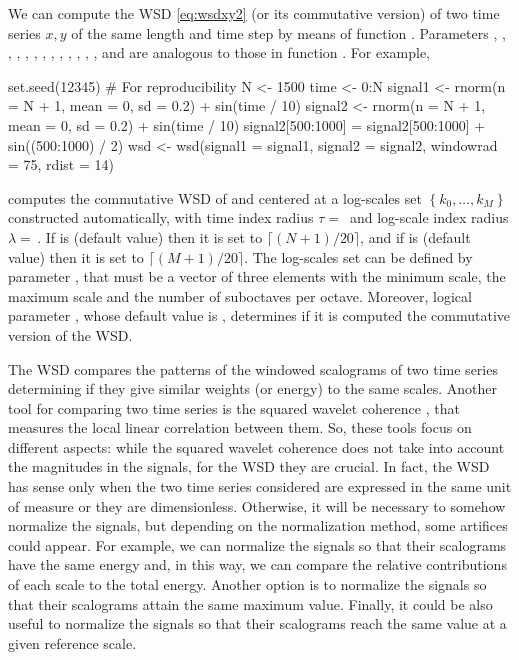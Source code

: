 We can compute the WSD \eqref{eq:wsdxy2} (or its commutative version) of two time series $x,y$ of the same length and time step by means of function . Parameters , , , , , , , , , , , , ,  and  are analogous to those in function . For example,
\begin{example}
set.seed(12345) # For reproducibility
N <- 1500
time <- 0:N
signal1 <- rnorm(n = N + 1, mean = 0, sd = 0.2) + sin(time / 10)
signal2 <- rnorm(n = N + 1, mean = 0, sd = 0.2) + sin(time / 10)
signal2[500:1000] = signal2[500:1000] + sin((500:1000) / 2)
wsd <- wsd(signal1 = signal1, signal2 = signal2,
           windowrad = 75, rdist = 14)
\end{example}
computes the commutative WSD of  and  centered at a log-scales set $\left\{ k_0,\ldots ,k_M\right\} $ constructed automatically, with time index radius $\tau =\,$ and log-scale index radius $\lambda =\,$. If  is  (default value) then it is set to $\lceil (N+1)/20\rceil $, and if  is  (default value) then it is set to $\lceil (M+1)/20\rceil $. The log-scales set can be defined by parameter , that must be a vector of three elements with the minimum scale, the maximum scale and the number of suboctaves per octave. Moreover, logical parameter , whose default value is , determines if it is computed the commutative version of the WSD.

\begin{rmk}[Normalization]
\label{rem:norm}
The WSD compares the patterns of the windowed scalograms of two time series determining if they give similar weights (or energy) to the same scales. Another tool for comparing two time series is the squared wavelet coherence \citep{tor98,tor99}, that measures the local linear correlation between them. So, these tools focus on different aspects: while the squared wavelet coherence does not take into account the magnitudes in the signals, for the WSD they are crucial. In fact, the WSD has sense only when the two time series considered are expressed in the same unit of measure or they are dimensionless. Otherwise, it will be necessary to somehow normalize the signals, but depending on the normalization method, some artifices could appear. For example, we can normalize the signals so that their scalograms have the same energy and, in this way, we can compare the relative contributions of each scale to the total energy. Another option is to normalize the signals so that their scalograms attain the same maximum value. Finally, it could be also useful to normalize the signals so that their scalograms reach the same value at a given reference scale.
\end{rmk}

